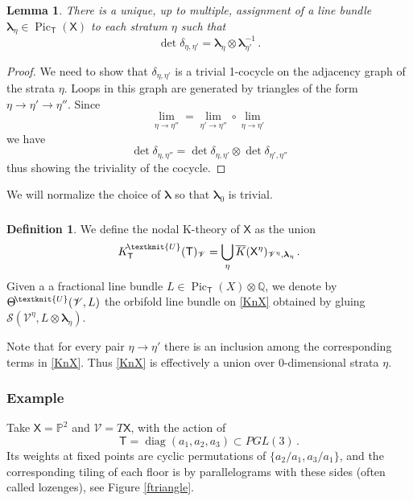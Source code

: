 \documentclass[14pt]{extarticle}
\newcommand{\Kn}{K^{\! \tiny\textknit{U}}}
\newcommand{\Thn}{\Theta^{\! \tiny\textknit{U}}}
\newcommand{\Q}{\mathbb{Q}}
\newcommand{\bT}{\mathsf{T}}
\newcommand{\bX}{\mathsf{X}}
\newcommand{\bP}{\mathbb{P}}
\newcommand{\cV}{\mathscr{V}}
\newcommand{\bla}{\boldsymbol{\lambda}}
\newcommand{\cS}{\mathscr{S}}
\DeclareMathOperator{\Pic}{Pic}
\DeclareMathOperator{\diag}{diag}
\newtheorem{Lemma}{Lemma}[section]
\theoremstyle{definition}
\newtheorem{Definition}{Definition}
\newcommand{\Kbar}{\overline{K}}
\begin{document}
\begin{Lemma}
There is a unique, up to multiple, assignment of a line bundle
$\bla_\eta \in \Pic_\bT(\bX)$ to each stratum $\eta$ such that
%
\begin{equation}
\det
\delta_{\eta,\eta'}  = \bla_{\eta} \otimes \bla_{\eta'}^{-1} \,. \label{bnubnu}
\end{equation}
%
\end{Lemma}

\begin{proof}
We need to show that $\delta_{\eta,\eta'}$ is a trivial 1-cocycle on
the adjacency graph of the strata $\eta$. Loops in this graph are
generated by triangles of the form $\eta\to \eta' \to \eta''$. Since
$$
\lim_{\eta \to \eta''} = \lim_{\eta' \to \eta''}  \circ \lim_{\eta \to
  \eta'}
$$
we have
$$
\det
\delta_{\eta,\eta''} = \det
\delta_{\eta,\eta'} \otimes \det
\delta_{\eta',\eta''}
$$
thus showing the triviality of the cocycle. 
\end{proof}

\noindent 
We will normalize the choice of $\bla$ so that $\bla_0$ is trivial. 

\subsubsection{}

\begin{Definition}
  We define the nodal K-theory of $\bX$ as the union
  \begin{equation}
  \Kn_\bT(\bT)_{\cV}  = \bigcup_\eta \Kbar(\bX^\eta)_{\cV^\eta,
    \bla_\eta} \,.
\label{KnX}
\end{equation}
% 
  Given a a fractional line bundle $L\in \Pic_\bT(X) \otimes \Q$, we
  denote by $\Thn(\cV,L)$ the orbifold line bundle on \eqref{KnX}
  obtained by gluing $\cS(\cV^\eta, L \otimes \bla_\eta)$. 
\end{Definition}

\noindent
Note that for every pair $\eta \to \eta'$ there is an inclusion among
the corresponding terms in \eqref{KnX}. Thus \eqref{KnX} is
effectively a union over $0$-dimensional strata $\eta$.





\subsubsection{Example}


Take $\bX=\bP^2$ and $\cV=T \bX$, with the action of
$$
\bT = \diag (a_1, a_2, a_3) \subset PGL(3) \,. 
$$
Its weights at fixed points are cyclic permutations of
$\{a_2/a_1,a_3/a_1\}$, and the corresponding tiling of each floor is
by parallelograms with these sides (often called lozenges), see Figure
\ref{ftriangle}.
\end{document}
